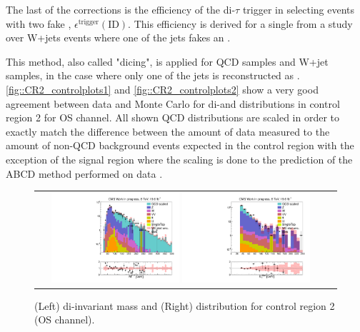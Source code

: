 The last of the corrections is the efficiency of the di-$\tau$ trigger in selecting events with two fake \hadtau , $\epsilon^{\text{trigger}}(\text{ID})$. This efficiency is derived for a single \hadtaufake from a study over W+jets events where one of the jets fakes an \hadtau.

This method, also called "dicing", is applied for QCD samples and W+jet samples, in the case where only one of the jets is reconstructed as \hadtaufake. 	\autoref{fig::CR2_controlplots1} and \autoref{fig::CR2_controlplots2} show a very good agreement between data and Monte Carlo for di-\hadtau and \met distributions in control region 2 for OS channel. All shown QCD distributions are scaled in order to exactly match the difference between the amount of data measured to the amount of non-QCD background events expected in the control region with the exception of the signal region where the scaling is done to the prediction of the ABCD method performed on data \cite{bib:phdthesis:denis}.


\begin{figure}[tbh!]
	\centering
	\begin{tabular}{cc}
		\includegraphics[width=0.45\textwidth]{PLOTS/diTauHadLSQCDPlots/AllMCdiced/OS_CR2/OS_Central_invertedVBF_2TightIso_CR2/h_ditauinvariantmass_log.pdf}
		\includegraphics[width=0.45\textwidth]{PLOTS/diTauHadLSQCDPlots/AllMCdiced/OS_CR2/OS_Central_invertedVBF_2TightIso_CR2/h_met_log.pdf} 		
	\end{tabular}
	\caption{(Left) di-\hadtau invariant mass and (Right) \met distribution for control region 2 (OS channel).}
	\label{fig::CR2_controlplots1}
\end{figure}

